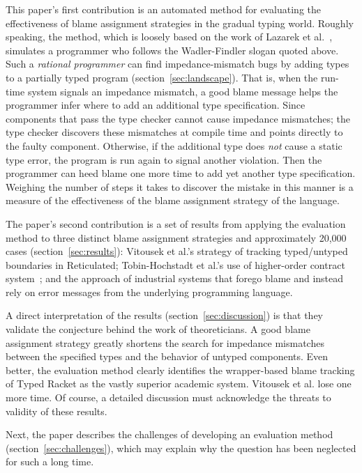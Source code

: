 This paper's first contribution is an automated method for evaluating the
effectiveness of blame assignment strategies in the gradual typing world.
Roughly speaking, the method, which is
loosely based on the work of Lazarek et al.~\cite{lksfd-popl-2020},
simulates a programmer who follows the Wadler-Findler slogan quoted above.
Such a \emph{rational programmer} can find impedance-mismatch
bugs by adding types to a partially typed program (section~\ref{sec:landscape}). That is, when the
run-time system signals an impedance mismatch, a good blame message helps
the programmer infer where to add an additional type specification. Since
components that pass the type checker cannot cause impedance mismatches;
the type checker discovers these mismatches at compile time and points
directly to the faulty component. Otherwise, if the
additional type does {\em not\/} cause a static type error, the program
 is run again to signal another violation. Then the programmer can heed
blame one more time to add yet another type specification. Weighing the number of
steps it takes to discover the mistake in this manner is a measure of the effectiveness
of the blame assignment strategy of the language.

The paper's second contribution is a set of results from applying the evaluation
method to three distinct blame assignment strategies and approximately 20,000
cases (section~\ref{sec:results}): Vitousek et
al.'s strategy of tracking typed/untyped boundaries in Reticulated;
Tobin-Hochstadt et al.'s use of higher-order contract system~\cite{ff-icfp-2002,
mf-toplas-2009}; and the approach of industrial systems that forego blame
and instead rely on error messages from the
underlying programming language.


A direct interpretation of the results (section~\ref{sec:discussion}) is that
they validate the conjecture behind the work of theoreticians. A good blame assignment
strategy
greatly shortens the search for impedance mismatches between the specified types
and the behavior of untyped components. Even better, the evaluation method clearly
identifies the wrapper-based blame tracking of Typed Racket as the vastly superior
academic system. Vitousek et al. lose one more time. Of course, a detailed
discussion must acknowledge the threats to validity of these results.

Next, the paper describes the challenges of developing an evaluation method
(section~\ref{sec:challenges}), which may explain why the question has been neglected
for such a long time.


